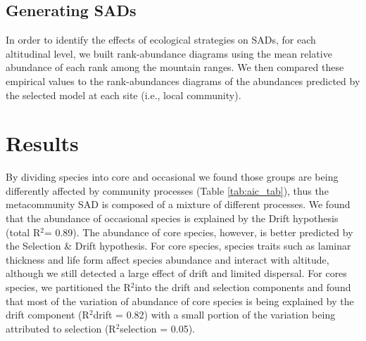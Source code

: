 \documentclass[12pt]{article}
\renewcommand{\Rsquared}{R{$^2$}}
\begin{document}
\subsection*{Generating SADs}

In order to identify the effects of ecological strategies on SADs, for each altitudinal level, we built rank-abundance diagrams using the mean relative abundance of each rank among the mountain ranges. We then compared these empirical
values to the rank-abundances diagrams of the abundances predicted by the selected model at each site (i.e., local community). 

\section*{Results}


By dividing species into core and occasional we found those groups are being differently affected by community processes (Table \ref{tab:aic_tab}), thus the metacommunity SAD is composed of a mixture of different processes. We found that the abundance of occasional species is explained by the Drift hypothesis (total \Rsquared = 0.89). The abundance of core species, however, is better
predicted
by the Selection \& Drift hypothesis. For core species, species traits such as laminar thickness and life form affect species abundance and interact with altitude, although we still detected a large effect of drift and limited dispersal. For cores species, we partitioned the \Rsquared into the drift and selection components and found that most of the variation of abundance of core species is being explained by the drift component (\Rsquared drift = 0.82) with a small portion of the variation  being attributed to selection (\Rsquared selection = 0.05). 
\end{document}
